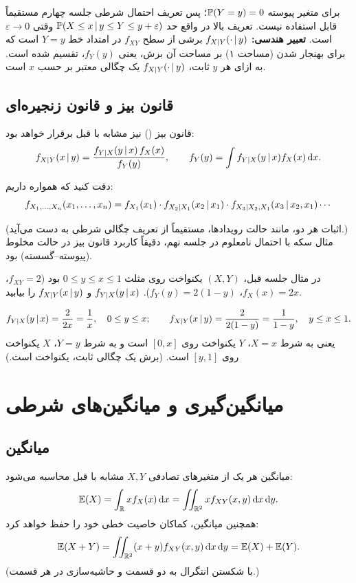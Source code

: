\begin{note}
\notetitle برای متغیر پیوسته $\mathbb{P}(Y=y)=0$؛ پس تعریف احتمال شرطی جلسه چهارم مستقیماً قابل استفاده نیست. تعریف بالا در واقع حد $\mathbb{P}(X\le x\,|\, y\le Y\le y+\varepsilon)$ وقتی $\varepsilon\to0$ است. \textbf{تعبیر هندسی:} $f_{X|Y}(\cdot\,|\, y)$ برشی از سطح $f_{XY}$ در امتداد خط $Y=y$ است که برای بهنجار شدن (مساحت ۱) بر مساحت آن برش، یعنی $f_Y(y)$، تقسیم شده است. به ازای هر $y$ ثابت، $f_{X|Y}(\cdot\,|\, y)$ یک چگالی معتبر بر حسب $x$ است.
\end{note}

\subsection{قانون بیز و قانون زنجیره‌ای}
\begin{theorem}
قانون بیز () نیز مشابه با قبل برقرار خواهد بود:
\[
f_{X|Y}(x\,|\, y)=\frac{f_{Y|X}(y\,|\, x)\,f_X(x)}{f_Y(y)},\qquad f_Y(y)=\int f_{Y|X}(y\,|\, x)f_X(x)\,\mathrm{d} x .
\]
\end{theorem}
\begin{theorem}
دقت کنید که همواره داریم:
\[
f_{X_1,\ldots,X_n}(x_1,\ldots,x_n)=f_{X_1}(x_1)\cdot f_{X_2|X_1}(x_2\,|\, x_1)\cdot f_{X_3|X_2,X_1}(x_3\,|\, x_2,x_1)\cdots
\]
\end{theorem}
(اثبات هر دو، مانند حالت رویدادها، مستقیماً از تعریف چگالی شرطی به دست می‌آید.) مثال سکه با احتمال نامعلوم در جلسه نهم، دقیقاً کاربرد قانون بیز در حالت مخلوط (پیوسته--گسسته) بود.

\begin{example}
در مثال جلسه قبل، $(X,Y)$ یکنواخت روی مثلث $0\le y\le x\le1$ بود ($f_{XY}=2$، $f_X(x)=2x$، $f_Y(y)=2(1-y)$). $f_{Y|X}(y\,|\, x)$ و $f_{X|Y}(x\,|\, y)$ را بیابید.
\begin{solution}
\[
f_{Y|X}(y\,|\, x)=\frac{2}{2x}=\frac1x,\quad 0\le y\le x;\qquad
f_{X|Y}(x\,|\, y)=\frac{2}{2(1-y)}=\frac{1}{1-y},\quad y\le x\le1 .
\]
یعنی به شرط $X=x$، $Y$ یکنواخت روی $[0,x]$ است و به شرط $Y=y$، $X$ یکنواخت روی $[y,1]$ است. (برش یک چگالی ثابت، یکنواخت است.)
\end{solution}
\end{example}

\section{میانگین‌گیری و میانگین‌های شرطی}

\subsection{میانگین}
میانگین هر یک از متغیرهای تصادفی $X,Y$ مشابه با قبل محاسبه می‌شود:
\[
\mathbb{E}(X)=\int_{\mathbb{R}} xf_X(x)\,\mathrm{d} x=\iint_{\mathbb{R}^2}xf_{XY}(x,y)\,\mathrm{d} x\,\mathrm{d} y .
\]
همچنین میانگین، کماکان خاصیت خطی خود را حفظ خواهد کرد:
\[
\mathbb{E}(X+Y)=\iint_{\mathbb{R}^2}(x+y)f_{XY}(x,y)\,\mathrm{d} x\,\mathrm{d} y=\mathbb{E}(X)+\mathbb{E}(Y).
\]
(با شکستن انتگرال به دو قسمت و حاشیه‌سازی در هر قسمت.)

